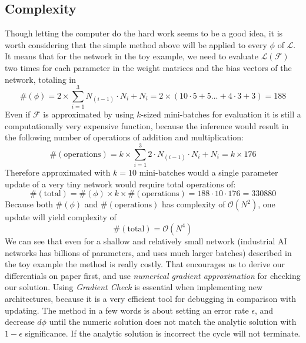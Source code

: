 \subsection{Complexity} 
Though letting the computer do the hard work seems to be a good idea, it is worth considering that the simple method above will be applied to every $\phi$ of $\mathcal{L}$.
It means that for the network in the toy example, we need to evaluate $\mathcal{L}(\mathcal{F})$ two times for each parameter in 
the weight matrices and the bias vectors of the network, totaling in 
$$\#(\phi) = 2\times\sum_{i=1}^3 N_{(i-1)}\cdot N_i + N_i = 2\times(10\cdot 5 + 5 ... + 4\cdot 3 + 3) = 188$$
Even if $\mathcal{F}$ is approximated by using $k$-sized mini-batches for evaluation it is still a computationally very expensive function, because the inference would result in the following number of operations of addition and multiplication:
$$\#(\mathrm{operations}) = k\times\sum_{i=1}^3 2\cdot N_{(i-1)}\cdot N_i + N_i = k \times 176$$
Therefore approximated with $k=10$ mini-batches would a single parameter update of a very tiny network would require total operations of:
\begin{equation}
    \#(\mathrm{total})=\#(\phi) \times k \times \#(\mathrm{operations}) = 188 \cdot 10 \cdot 176  = 330880
\end{equation}
Because both $\#(\phi)$ and $\#(\mathrm{operations})$ has complexity of $\mathcal{O}(N^2)$, one update will yield complexity of 
\begin{equation}
    \#(\mathrm{total})=\mathcal{O}(N^4)
\end{equation}
We can see that even for a shallow and relatively small network (industrial AI networks has billions of parameters, and uses much larger batches) described in the toy example the method is really costly.
That encourages us to derive our differentials on paper first, and use \emph{numerical gradient approximation} for checking our solution. Using \emph{Gradient Check} is essential when implementing new architectures, because it is a very efficient tool for debugging in comparison with updating. The method in a few words is about setting an error rate $\epsilon$, and decrease $d\phi$ until the numeric solution does not match the analytic solution with $1-\epsilon$ significance. If the analytic solution is incorrect the cycle will not terminate.


